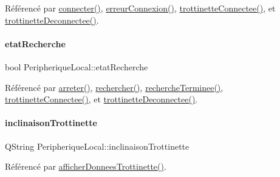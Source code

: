 Référencé par \hyperlink{class_peripherique_local_af2e7f023f8ed72ebc1d36e66c440ceca}{connecter()}, \hyperlink{class_peripherique_local_abb86db4a2a3d72a5de32253aa9af1ce8}{erreur\+Connexion()}, \hyperlink{class_peripherique_local_ad6e76380e6c9f48c36a10ac4af2c3d96}{trottinette\+Connectee()}, et \hyperlink{class_peripherique_local_ab081485bf0f9403d9e7fc5f0407cdc5c}{trottinette\+Deconnectee()}.

\mbox{\label{class_peripherique_local_a6638c29f6f75c3b4d329d93ae6ea4a48}} 
\paragraph{\texorpdfstring{etat\+Recherche}{etatRecherche}}
{\footnotesize\ttfamily bool Peripherique\+Local\+::etat\+Recherche}



Référencé par \hyperlink{class_peripherique_local_afbbb6d37b616cc4579486c3b1ce700b2}{arreter()}, \hyperlink{class_peripherique_local_aa3b12b1c122605cf00b8ab48ed4284c1}{rechercher()}, \hyperlink{class_peripherique_local_a16add86080e72a5ce804ff9296e10415}{recherche\+Terminee()}, \hyperlink{class_peripherique_local_ad6e76380e6c9f48c36a10ac4af2c3d96}{trottinette\+Connectee()}, et \hyperlink{class_peripherique_local_ab081485bf0f9403d9e7fc5f0407cdc5c}{trottinette\+Deconnectee()}.

\mbox{\label{class_peripherique_local_ab85a254ce801dcdebd6be972aea0638b}} 
\paragraph{\texorpdfstring{inclinaison\+Trottinette}{inclinaisonTrottinette}}
{\footnotesize\ttfamily Q\+String Peripherique\+Local\+::inclinaison\+Trottinette}



Référencé par \hyperlink{class_peripherique_local_a5702930929fea3e197fc1938a2303961}{afficher\+Donnees\+Trottinette()}.

\mbox{\label{class_peripherique_local_a16dcebf91bf74b8e3f1c2d90b77dda29}} 
